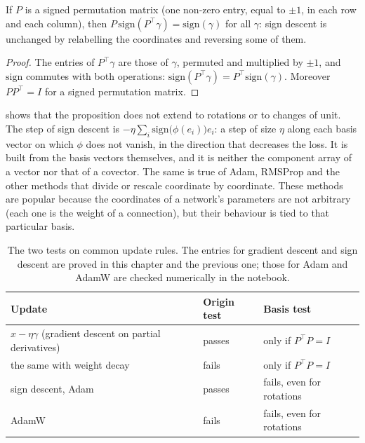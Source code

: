 \begin{notechapter}
\begin{proposition}
\label{duality:prop:sign}
If $P$ is a signed permutation matrix (one non-zero entry, equal to $\pm1$,
in each row and each column), then
$P\,\mathrm{sign}(P^\top\gamma) = \mathrm{sign}(\gamma)$ for all $\gamma$:
sign descent is unchanged by relabelling the coordinates and reversing
some of them.
\end{proposition}

\begin{proof}
The entries of $P^\top\gamma$ are those of $\gamma$, permuted and
multiplied by $\pm1$, and $\mathrm{sign}$ commutes with both operations:
$\mathrm{sign}(P^\top\gamma) = P^\top\mathrm{sign}(\gamma)$. Moreover
$PP^\top = I$ for a signed permutation matrix.
\end{proof}

 shows that the proposition does not extend to
rotations or to changes of unit. The step of sign descent is
$-\eta\sum_i\mathrm{sign}\bigl(\phi(e_i)\bigr)e_i$: a step of size
$\eta$ along each basis vector on which $\phi$ does not vanish, in the
direction that decreases the loss. It is built from
the basis vectors themselves, and it is neither the component array of a
vector nor that of a covector. The same is true of Adam, RMSProp and the
other methods that divide or rescale coordinate by coordinate. These
methods are popular because the coordinates of a network's parameters are
not arbitrary (each one is the weight of a connection), but their
behaviour is tied to that particular basis.

\begin{table}[ht]
\centering
\begin{tabular}{@{}lll@{}}
\toprule
Update & Origin test & Basis test \\
\midrule
$x - \eta\gamma$ (gradient descent on partial derivatives)
  & passes & only if $P^\top P = I$ \\
the same with weight decay & fails & only if $P^\top P = I$ \\
sign descent, Adam & passes & fails, even for rotations \\
AdamW & fails & fails, even for rotations \\
\bottomrule
\end{tabular}
\caption{The two tests on common update rules. The entries for gradient
descent and sign descent are proved in this chapter and the previous one;
those for Adam and AdamW are checked numerically in the notebook.}
\label{duality:tab:tests}
\end{table}


\end{notechapter}
